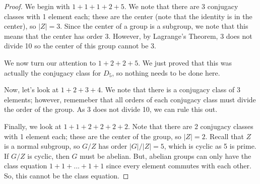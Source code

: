 \documentclass[letterpaper]{article}
\begin{document}
\begin{mdframed}
    \begin{proof}
        We begin with $1 + 1 + 1 + 2 + 5$. We note that there are 3 conjugacy classes with 1 element each; these are the center (note that the identity is in the center), so $|Z| = 3$. Since the center of a group is a subgroup, we note that this means that the center has order 3. However, by Lagrange's Theorem, 3 does not divide 10 so the center of this group cannot be 3. 

        \bigskip

        We now turn our attention to $1 + 2 + 2 + 5$. We just proved that this was actually the conjugacy class for $D_5$, so nothing needs to be done here. 

        \bigskip

        Now, let's look at $1 + 2 + 3 + 4$. We note that there is a conjugacy class of 3 elements; however, rememeber that all orders of each conjugacy class must divide the order of the group. As 3 does not divide 10, we can rule this out. 

        \bigskip

        Finally, we look at $1 + 1 + 2 + 2 + 2 + 2$. Note that there are 2 conjugacy classes with 1 element each; these are the center of the group, so $|Z| = 2$. Recall that $Z$ is a normal subgroup, so $G / Z$ has order $|G| / |Z| = 5$, which is cyclic as 5 is prime. If $G/Z$ is cyclic, then $G$ must be abelian. But, abelian groups can only have the class equation $1 + 1 + \dots + 1 + 1$ since every element commutes with each other. So, this cannot be the class equation. 
    \end{proof}
\end{mdframed}
\end{document}
